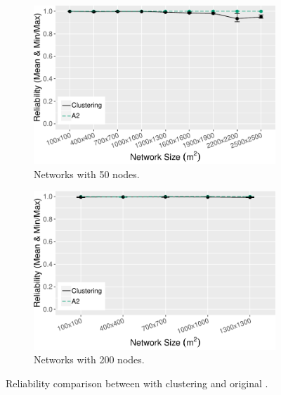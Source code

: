 \begin{figure}[bt]
    \centering
    \begin{subfigure}{0.7\textwidth}
        \centering
        \includegraphics[width=\textwidth]{figure/Results/ChaosComparison/ChaosComparison_50_Reliability.pdf}
        \caption{Networks with 50 nodes.}
        \label{subfig:reliability-50-nodes}
    \end{subfigure}
    \hfill
    \begin{subfigure}{0.7\textwidth}
        \centering
        \includegraphics[width=\textwidth]{figure/Results/ChaosComparison/ChaosComparison_200_Reliability.pdf}
        \caption{Networks with 200 nodes.}
        \label{subfig:reliabilty-200-nodes}
    \end{subfigure}
    \caption{Reliability comparison between \atwo{} with clustering and original \atwo{}.}
    \label{fig:reliability-result}
\end{figure}
